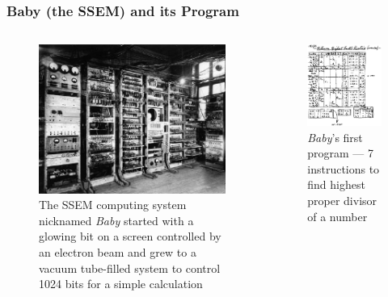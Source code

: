 \documentclass[handout]{beamer}
\begin{document}
\begin{frame}
  \frametitle{Baby (the SSEM) and its Program}
  \begin{columns}
    \begin{figure}
      \centering
      \includegraphics[width=0.8\linewidth]{Graphics/SSEM.jpg}
      \caption{The SSEM computing system nicknamed \emph{Baby} started with a glowing bit on a screen controlled by an electron beam and grew to a vacuum tube-filled system to control \num{1024} bits for a simple calculation}
      \label{fig:Baby}
    \end{figure}

    \begin{figure}
      \centering
      \includegraphics[width=0.9\linewidth]{Graphics/first_prog.jpg}
      \caption{\emph{Baby}'s first program --- 7 instructions to find highest proper divisor of a number}
      \label{fig:Baby-1st-program}
    \end{figure}  
  \end{columns}
\end{frame}
\end{document}
